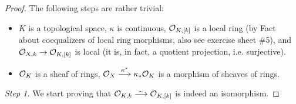 \documentclass[a4paper,parskip=half,numbers=enddot, DIV=12]{scrreprt}
\begin{document}
\begin{proof}
    The following steps are rather trivial:
    \begin{itemize}
      \item 
        $K$ is a topological space, $\kappa$ is continuous, $\mathcal{O}_{K,[k]}$ is a local ring (by Fact~ about coequalizers of local ring morphisms, also see exercise sheet \#5), and $\Oo_{X,k} \morphism \Oo_{K,[k]}$ is local (it is, in fact, a quotient projection, i.e. surjective).
      \item 
        $\mathcal{O}_K$ is a sheaf of rings, $\Oo_X \morphism[\kappa^*] \kappa_*\Oo_K$ is a morphism of sheaves of rings.
    \end{itemize} 
    \emph{Step 1.} We start proving that $\Oo_{K,k}\isomorphism\Oo_{K,[k]}$ is indeed an isomorphism. 
    

\end{proof}
\end{document}
